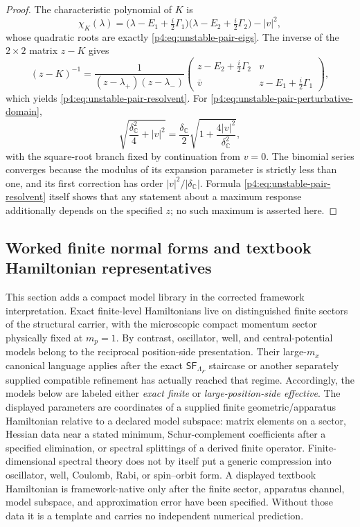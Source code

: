\documentclass[12pt,a4paper]{article}
\begin{document}
\begin{proof}
The characteristic polynomial of $K$ is
\[
\chi_K(\lambda)=\bigl(\lambda-E_1+\tfrac{i}{2}\Gamma_1\bigr)\bigl(\lambda-E_2+\tfrac{i}{2}\Gamma_2\bigr)-|v|^2,
\]
whose quadratic roots are exactly \eqref{p4:eq:unstable-pair-eigs}.
The inverse of the $2\times2$ matrix $z-K$ gives
\[
(z-K)^{-1}
=
\frac{1}{(z-\lambda_+)(z-\lambda_-)}
\begin{pmatrix}
 z-E_2+\frac{i}{2}\Gamma_2 & v\\
 \overline v & z-E_1+\frac{i}{2}\Gamma_1
\end{pmatrix},
\]
which yields \eqref{p4:eq:unstable-pair-resolvent}.
For \eqref{p4:eq:unstable-pair-perturbative-domain},
\[
\sqrt{\frac{\delta_{\mathbb C}^2}{4}+|v|^2}
=
\frac{\delta_{\mathbb C}}2
\sqrt{1+\frac{4|v|^2}{\delta_{\mathbb C}^2}},
\]
with the square-root branch fixed by continuation from \(v=0\).  The binomial
series converges because the modulus of its expansion parameter is strictly
less than one, and its first correction has order
\(|v|^2/|\delta_{\mathbb C}|\).  Formula
\eqref{p4:eq:unstable-pair-resolvent} itself shows that any statement about a
maximum response additionally depends on the specified \(z\); no such maximum
is asserted here.
\end{proof}



\subsection{Worked finite normal forms and textbook Hamiltonian representatives}
\label{p4:sec:part2-worked-models}

This section adds a compact model library in the corrected framework interpretation.
Exact finite-level Hamiltonians live on distinguished finite sectors of the structural carrier, with the microscopic compact momentum sector physically fixed at $m_p=1$.
By contrast, oscillator, well, and central-potential models belong to the
reciprocal position-side presentation.  Their large-\(m_x\) canonical
language applies after the exact \(\mathsf{SF}_{\Lambda_F}\) staircase or another
separately supplied compatible refinement has actually reached that regime.
Accordingly, the models below are labeled either \emph{exact finite} or \emph{large-position-side effective}.
The displayed parameters are coordinates of a supplied finite
geometric/apparatus Hamiltonian relative to a declared model subspace: matrix
elements on a sector, Hessian data near a stated minimum, Schur-complement
coefficients after a specified elimination, or spectral splittings of a
derived finite operator.  Finite-dimensional spectral theory does not by
itself put a generic compression into oscillator, well, Coulomb, Rabi, or
spin--orbit form.  A displayed textbook Hamiltonian is framework-native only
after the finite sector, apparatus channel, model subspace, and approximation
error have been specified.  Without those data it is a template and carries no
independent numerical prediction.
\end{document}
